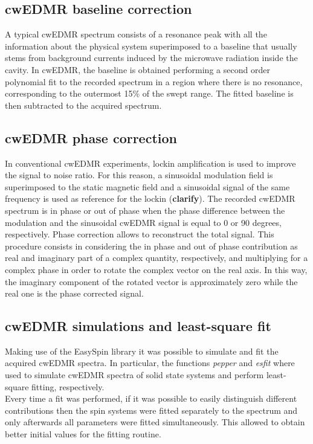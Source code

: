 \documentclass[a4paper]{book}
\begin{document}
	\subsection{cwEDMR baseline correction}
	A typical cwEDMR spectrum consists of a resonance peak with all the information about the physical system superimposed to a baseline that usually stems from background currents induced by the microwave radiation inside the cavity. In cwEDMR, the baseline is obtained performing a second order polynomial fit to the recorded spectrum in a region where there is no resonance, corresponding to the outermost 15\% of the swept range. The fitted baseline is then subtracted to the acquired spectrum.
	\subsection{cwEDMR phase correction}
	In conventional cwEDMR experiments, lockin amplification is used to improve the signal to noise ratio. For this reason, a sinusoidal modulation field is superimposed to the static magnetic field and a sinusoidal signal of the same frequency is used as reference for the lockin (\textbf{clarify}). The recorded cwEDMR spectrum is in phase or out of phase when the phase difference between the modulation and the sinusoidal cwEDMR signal is equal to 0 or 90 degrees, respectively. Phase correction allows to reconstruct the total signal. This procedure consists in considering the in phase and out of phase contribution as real and imaginary part of a complex quantity, respectively, and multiplying for a complex phase in order to rotate the complex vector on the real axis. In this way, the imaginary component of the rotated vector is approximately zero while the real one is the phase corrected signal.
	\subsection{cwEDMR simulations and least-square fit}
	Making use of the EasySpin library it was possible to simulate and fit the acquired cwEDMR spectra. In particular, the functions \textit{pepper} and \textit{esfit} where used to simulate cwEDMR spectra of solid state systems and perform least-square fitting, respectively.\\
	Every time a fit was performed, if it was possible to easily distinguish different contributions then the spin systems were fitted separately to the spectrum and only afterwards all parameters were fitted simultaneously. This allowed to obtain better initial values for the fitting routine.\\
\end{document}
